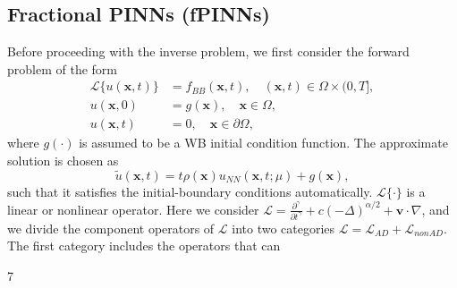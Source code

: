 \documentclass[UTF8]{article}
\begin{document}
\subsection{Fractional PINNs (fPINNs)}
Before proceeding with the inverse problem, we first consider the forward problem of the form
\begin{equation}
\begin{aligned}
\mathcal{L}\{u(\boldsymbol{x}, t)\} &= f_{BB}(\boldsymbol{x}, t), \quad (\boldsymbol{x}, t) \in \Omega \times (0, T], \\
u(\boldsymbol{x}, 0) &= g(\boldsymbol{x}), \quad \boldsymbol{x} \in \Omega, \\
u(\boldsymbol{x}, t) &= 0, \quad \boldsymbol{x} \in \partial \Omega,
\end{aligned}
\end{equation}
where $g(\cdot)$ is assumed to be a WB initial condition function. The approximate solution is chosen as
\begin{equation}
\tilde{u}(\boldsymbol{x}, t) = t\rho(\boldsymbol{x})u_{NN}(\boldsymbol{x}, t; \mu) + g(\boldsymbol{x}),
\end{equation}
such that it satisfies the initial-boundary conditions automatically. $\mathcal{L}\{\cdot\}$ is a linear or nonlinear operator. Here we consider $\mathcal{L} = \frac{\partial^\gamma}{\partial t^\gamma} + c(-\Delta)^{\alpha/2} + \boldsymbol{v} \cdot \nabla$, and we divide the component operators of $\mathcal{L}$ into two categories $\mathcal{L} = \mathcal{L}_{AD} + \mathcal{L}_{nonAD}$. The first category includes the operators that can

\vfill
7
\end{document}
